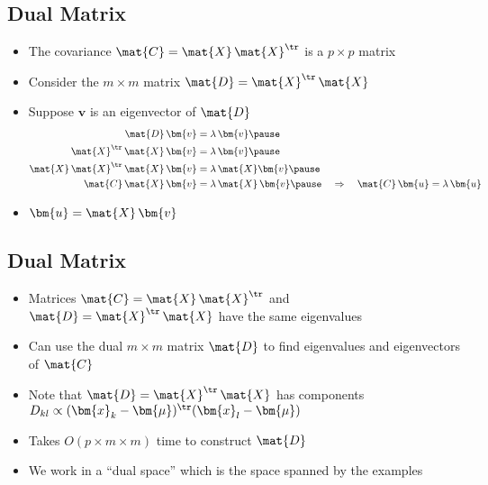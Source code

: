 
\begin{slide}
\section[-2]{Dual Matrix}

\begin{PauseHighLight}
  \begin{itemize}
  \item The covariance $\mat{C} = \mat{X}\,\mat{X}^\tr$ is a $p\times p$
    matrix\pause
  \item Consider the $m\times m$ matrix $\mat{D} =
    \mat{X}^\tr\,\mat{X}$\pause 
  \item Suppose $\bm{v}$ is an eigenvector of $\mat{D}$
    \begin{align*}
      \mat{D}\, \bm{v} &= \lambda\, \bm{v}\pause
      \\
      \mat{X}^\tr\,\mat{X}\,\bm{v} &= \lambda\, \bm{v}\pause
      \\
      \mat{X} \, \mat{X}^\tr\,\mat{X}\,\bm{v} &= \lambda\, \mat{X}
      \bm{v}\pause
      \\
      \mat{C}\,\mat{X}\,\bm{v} &= \lambda\, \mat{X}\,\bm{v}\pause 
                                 \quad \Rightarrow
      \quad \mat{C} \,\bm{u} = \lambda \, \bm{u}
    \end{align*}
  \item $\bm{u} = \mat{X}\,\bm{v}$\pause
  \end{itemize}
\end{PauseHighLight}

\end{slide}


\begin{slide}
\section{Dual Matrix}

\begin{PauseHighLight}
  \begin{itemize}
  \item Matrices $\mat{C} = \mat{X}\,\mat{X}^\tr$ and $\mat{D} =
    \mat{X}^\tr\,\mat{X}$ have the same eigenvalues\pause
  \item Can use the dual $m\times m$ matrix $\mat{D}$ to find eigenvalues
    and eigenvectors of $\mat{C}$\pause
  \item Note that $\mat{D} = \mat{X}^\tr\,\mat{X}$ has components
    $D_{kl} \propto (\bm{x}_k -\bm{\mu})^\tr (\bm{x}_l -\bm{\mu})$\pause
  \item Takes $O(p\times m \times m)$ time to construct $\mat{D}$\pause
  \item We work in a ``dual space'' which is the space spanned by the examples\pause
  \end{itemize}
\end{PauseHighLight}

\end{slide}

